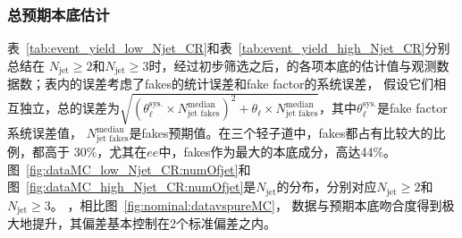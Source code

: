 \subsubsection{总预期本底估计}
表~\ref{tab:event_yield_low_Njet_CR}和表~\ref{tab:event_yield_high_Njet_CR}分别总结在
$N_{\text{jet}}\geq2$和$N_{\text{jet}}\geq3$时，经过初步筛选之后，的各项本底的估计值与观测数据数；表内的误差考虑了fakes的统计误差和fake factor的系统误差，
假设它们相互独立，总的误差为$\sqrt{({\theta_{\ell}^{\text{sys.}}\times N^{\text{median}}_{\text{jet fakes}}})^2+\theta_{\ell}\times N^{\text{median}}_{\text{jet fakes}}}$，其中$\theta_{\ell}^{\text{sys.}}$是fake factor系统误差值，
$N^{\text{median}}_{\text{jet fakes}}$是fakes预期值。在三个轻子道中，fakes都占有比较大的比例，都高于
30\%，尤其在$ee$中，fakes作为最大的本底成分，高达44\%。
图~\ref{fig:dataMC_low_Njet_CR:numOfjet}和图~\ref{fig:dataMC_high_Njet_CR:numOfjet}是$N_{\text{jet}}$的分布，分别对应$N_{\text{jet}}\geq2$和$N_{\text{jet}}\geq3$。
，相比图~\ref{fig:nominal:datavspureMC}，
数据与预期本底吻合度得到极大地提升，其偏差基本控制在2个标准偏差之内。

